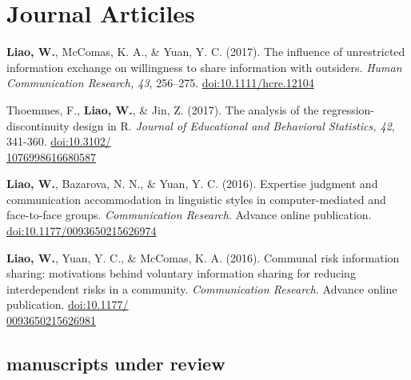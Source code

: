 \documentclass[11pt, letterpaper]{article} %
\newcommand{\years}[1]{\leavevmode\marginnote{\scriptsize #1}} %
\begin{document}
\section*{Journal Articiles}

\begin{hangparas}{.25in}{1}
    
    \textbf{Liao, W.}, McComas, K. A., \& Yuan, Y. C. (2017). \years{2017} The influence of unrestricted information exchange on willingness to share information with outsiders. \textsl{Human Communication Research, 43}, 256–275. \href{http://doi.org/10.1111/hcre.12104}{doi:10.1111/hcre.12104}  

    Thoemmes, F., \textbf{Liao, W.}, \& Jin, Z. (2017). The analysis of the regression-discontinuity design in R. \textsl{Journal of Educational and Behavioral Statistics, 42}, 341-360. \href{http://doi.org/10.3102/1076998616680587}{doi:10.3102/\\1076998616680587} 

    \textbf{Liao, W.}, Bazarova, N. N., \& Yuan, Y. C. (2016). \years{2016} Expertise judgment and communication accommodation in linguistic styles in computer-mediated and face-to-face groups. \textsl{Communication Research}. Advance online publication. \href{http://doi.org/10.1177/0093650215626974}{doi:10.1177/0093650215626974}

    \textbf{Liao, W.}, Yuan, Y. C., \& McComas, K. A. (2016). Communal risk information sharing: motivations behind voluntary information sharing for reducing interdependent risks in a community. \textsl{Communication Research}. Advance online publication. \href{http://doi.org/10.1177/0093650215626981}{doi:10.1177/\\0093650215626981}

    \vspace{\parskip}
\end{hangparas} 


\subsection*{manuscripts under review}
\end{document}
